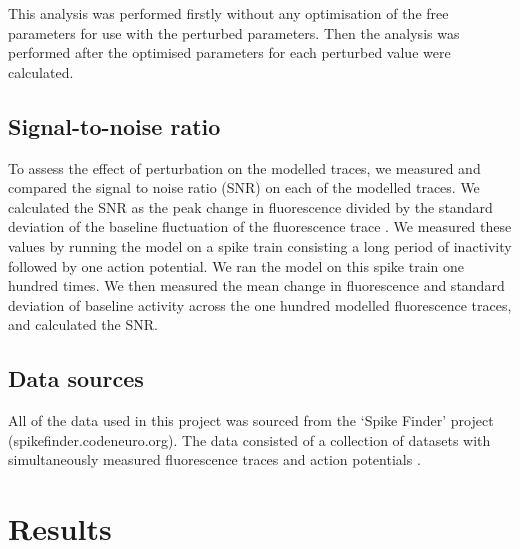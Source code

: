 This analysis was performed firstly without any optimisation of the free parameters for use with the perturbed parameters. Then the analysis was performed after the optimised parameters for each perturbed value were calculated.

\subsection{Signal-to-noise ratio}\label{sec:snr}
To assess the effect of perturbation on the modelled traces, we measured and compared the signal to noise ratio (SNR) on each of the modelled traces. We calculated the SNR as the peak change in fluorescence divided by the standard deviation of the baseline fluctuation of the fluorescence trace  \parencite{tada}. We measured these values by running the model on a spike train consisting a long period of inactivity followed by one action potential. We ran the model on this spike train one hundred times. We then measured the mean change in fluorescence and standard deviation of baseline activity across the one hundred modelled fluorescence traces, and calculated the SNR.

\subsection{Data sources}
All of the data used in this project was sourced from the ‘Spike Finder’ project (spikefinder.codeneuro.org). The data consisted of a collection of datasets with simultaneously measured fluorescence traces and action potentials  \parencite{berens}.

\section{Results}
